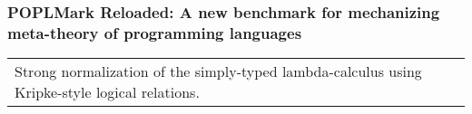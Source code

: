 \title[POPLMark Reloaded!]
{}


\author[A. Abel, A. Momigliano, B. Pientka]{Andreas Abel  \and Alberto Momigliano 
             \and Brigitte Pientka }






\sf
\maketitle

\newcommand{\bbox}{--}

\newcommand{\impl}{\supset}
\newcommand{\xmark}{\text{\ding{55}}}


\begin{frame}\frametitle{POPLMark Reloaded: A new benchmark for mechanizing meta-theory of programming languages}%

\Large
\begin{center}
\begin{tabular}{p{10cm}}
Strong normalization of the simply-typed lambda-calculus using
Kripke-style  %
logical relations.
\end{tabular}
\end{center}




\end{frame}

